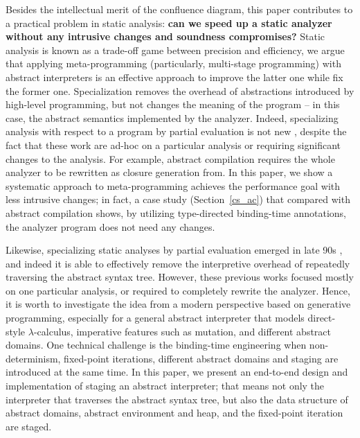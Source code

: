
Besides the intellectual merit of the confluence diagram, this paper contributes
to a practical problem in static analysis: \textbf{can we speed up a static analyzer
without any intrusive changes and soundness compromises?} Static analysis is
known as a trade-off game between precision and efficiency, we argue that
applying meta-programming (particularly, multi-stage programming) with abstract
interpreters is an effective approach to improve the latter one while fix the
former one. Specialization removes the overhead of abstractions introduced by
high-level programming, but not changes the meaning of the program -- in this
case, the abstract semantics implemented by the analyzer.
Indeed, specializing analysis with respect to a program by partial evaluation
is not new \cite{damian1999partial, amtoft1999partial,
  Boucher:1996:ACN:647473.727587, ashley:practical}, despite the fact that these
work are ad-hoc on a particular analysis or requiring significant changes to
the analysis. For example, abstract compilation \cite{Boucher:1996:ACN:647473.727587}
requires the whole analyzer to be rewritten as closure generation from. In this
paper, we show a systematic approach to meta-programming achieves the
performance goal with less intrusive changes; in fact, a case study
(Section~\ref{cs_ac}) that compared with abstract compilation shows, by
utilizing type-directed binding-time annotations, the analyzer program does not
need any changes.


\iffalse
Likewise, specializing static analyses by partial evaluation emerged in late 90s
, and indeed it is able to effectively remove the interpretive
overhead of repeatedly traversing the abstract syntax tree. However, these
previous works focused mostly on one particular analysis, or required to
completely rewrite the analyzer. Hence, it is worth to investigate the idea from
a modern perspective based on generative programming, especially for a general
abstract interpreter that models direct-style $\lambda$-calculus, imperative
features such as mutation, and different abstract domains. One technical
challenge is the binding-time engineering when non-determinism, fixed-point
iterations, different abstract domains and staging are introduced at the same
time. In this paper, we present an end-to-end design and implementation of
staging an abstract interpreter; that means not only the interpreter that
traverses the abstract syntax tree, but also the data structure of abstract
domains, abstract environment and heap, and the fixed-point iteration are
staged.

